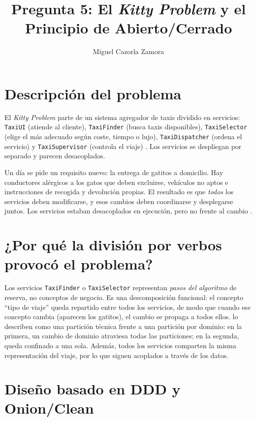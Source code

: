 \documentclass[11pt,a4paper]{article}
\title{Pregunta 5: El \textit{Kitty Problem} y el Principio de Abierto/Cerrado}
\author{Miguel Cazorla Zamora}
\date{}
\begin{document}
\maketitle
\thispagestyle{empty}

\section{Descripción del problema}

El \textit{Kitty Problem} parte de un sistema agregador de taxis dividido en
servicios: \texttt{TaxiUI} (atiende al cliente), \texttt{TaxiFinder} (busca taxis
disponibles), \texttt{TaxiSelector} (elige el más adecuado según coste, tiempo o
lujo), \texttt{TaxiDispatcher} (ordena el servicio) y \texttt{TaxiSupervisor}
(controla el viaje) \citep{martin2017}. Los servicios se despliegan por separado
y parecen desacoplados.

Un día se pide un requisito nuevo: la entrega de gatitos a domicilio. Hay
conductores alérgicos a los gatos que deben excluirse, vehículos no aptos e
instrucciones de recogida y devolución propias. El resultado es que \emph{todos}
los servicios deben modificarse, y esos cambios deben coordinarse y desplegarse
juntos. Los servicios estaban desacoplados en ejecución, pero no frente al
cambio \citep{martin2017}.

\section{¿Por qué la división por verbos provocó el problema?}

Los servicios \texttt{TaxiFinder} o \texttt{TaxiSelector} representan
\emph{pasos del algoritmo} de reserva, no conceptos de negocio. Es una
descomposición funcional: el concepto ``tipo de viaje'' queda repartido entre
todos los servicios, de modo que cuando ese concepto cambia (aparecen los
gatitos), el cambio se propaga a todos ellos. \citet{richards2020} lo describen
como una partición técnica frente a una partición por dominio: en la primera, un
cambio de dominio atraviesa todas las particiones; en la segunda, queda
confinado a una sola. Además, todos los servicios comparten la misma
representación del viaje, por lo que siguen acoplados a través de los datos.

\section{Diseño basado en DDD y Onion/Clean}
\end{document}
